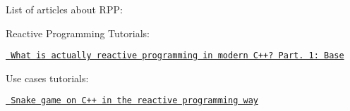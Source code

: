 List of articles about R\+PP\+:

Reactive Programming Tutorials\+:
\begin{DoxyItemize}
\item \href{https://medium.com/@victimsnino/what-is-actually-reactive-programming-in-modern-c-part-1-base-929355ac2901?source=friends_link&sk=59986e68b0688469c65ca0c757bbfd89}{\texttt{ What is actually reactive programming in modern C++? Part. 1\+: Base}}
\end{DoxyItemize}

Use cases tutorials\+:
\begin{DoxyItemize}
\item \href{https://medium.com/@victimsnino/snake-game-on-c-in-the-reactive-programming-way-19310a73923a?source=friends_link&sk=608039f66da373d4f81c806ffe58298c}{\texttt{ Snake game on C++ in the reactive programming way}} 
\end{DoxyItemize}